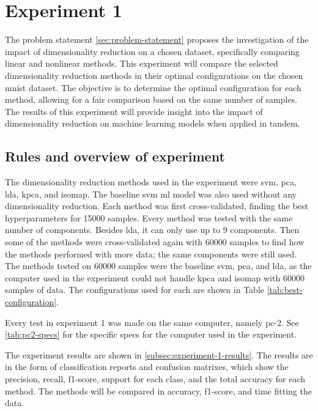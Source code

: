 \section{Experiment 1}\label{sec:experiment-1}
The problem statement \ref{sec:problem-statement} proposes the investigation of the impact of dimensionality reduction on a chosen dataset, specifically comparing linear and nonlinear methods. This experiment will compare the selected dimensionality reduction methods in their optimal configurations on the chosen \gls{mnist} dataset. The objective is to determine the optimal configuration for each method, allowing for a fair comparison based on the same number of samples. The results of this experiment will provide insight into the impact of dimensionality reduction on machine learning models when applied in tandem.

\subsection{Rules and overview of experiment}\label{subsec:experiment-1-rules}
The dimensionality reduction methods used in the experiment were \gls{svm}, \gls{pca}, \gls{lda}, \gls{kpca}, and \gls{isomap}. The baseline \gls{svm} \gls{ml} model was also used without any dimensionality reduction. Each method was first cross-validated, finding the best hyperparameters for 15000 samples. Every method was tested with the same number of components. Besides \gls{lda}, it can only use up to 9 components. Then some of the methods were cross-validated again with 60000 samples to find how the methods performed with more data; the same components were still used. The methods tested on 60000 samples were the baseline \gls{svm}, \gls{pca}, and \gls{lda}, as the computer used in the experiment could not handle \gls{kpca} and \gls{isomap} with 60000 samples of data. The configurations used for each are shown in Table \ref{tab:best-configuration}.



Every test in experiment 1 was made on the same computer, namely pc-2. See \autoref{tab:pc2-specs} for the specific specs for the computer used in the experiment. 

The experiment results are shown in \autoref{subsec:experiment-1-results}. The results are in the form of classification reports and confusion matrixes, which show the precision, recall, f1-score, support for each class, and the total accuracy for each method. The methods will be compared in accuracy, f1-score, and time fitting the data.

